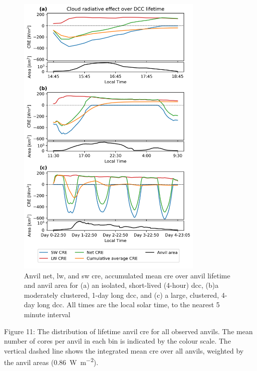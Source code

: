 \begin{figure}[t]
    \centering
    \includegraphics[width=0.8\textwidth]{figures/ch3_10.png}
    \caption[
    Anvil net, \acrshort{lw}, and \acrshort{sw} \acrshort{cre}, accumulated mean \acrshort{cre} over anvil lifetime
    ]{
    Anvil net, \acrshort{lw}, and \acrshort{sw} \acrshort{cre}, accumulated mean \acrshort{cre} over anvil lifetime and anvil area for (a) an isolated, short-lived (4-hour) \acrshort{dcc}, (b)a moderately clustered, 1-day long \acrshort{dcc}, and (c) a large, clustered, 4-day long \acrshort{dcc}. All times are the local solar time, to the nearest 5 minute interval
    }
    \label{fig:cre_lifecycle_examples}
\end{figure}


Figure 11: The distribution of lifetime anvil \acrshort{cre} for all observed
anvils. The mean number of cores per anvil in each bin is indicated by
the colour scale. The vertical dashed line shows the integrated mean \acrshort{cre}
over all anvils, weighted by the anvil areas (0.86
\,\unit{W m^{-2}}).

